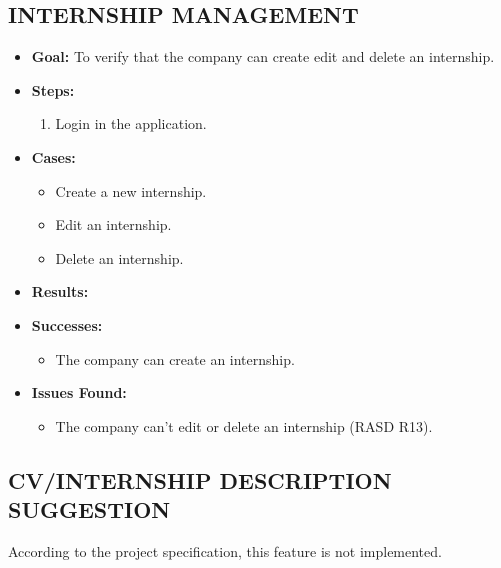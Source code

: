 \subsection{INTERNSHIP MANAGEMENT}\label{subsec:internship-management}
\begin{itemize}
    \item \textbf{Goal:} To verify that the company can create edit and delete an internship.

    \item \textbf{Steps:}
    \begin{enumerate}
        \item Login in the application.

    \end{enumerate}
    \item \textbf{Cases:}
    \begin{itemize}
        \item Create a new internship.
        \item Edit an internship.
        \item Delete an internship.
    \end{itemize}
    \item \textbf{Results:}
    \item \textbf{Successes:}
    \begin{itemize}
        \item The company can create an internship.
    \end{itemize}
    \item \textbf{Issues Found:}
    \begin{itemize}
        \item The company can't edit or delete an internship (RASD R13).
    \end{itemize}
\end{itemize}

\subsection{CV/INTERNSHIP DESCRIPTION SUGGESTION}\label{subsec:cv-internship-description-suggestion}
According to the project specification, this feature is not implemented.


